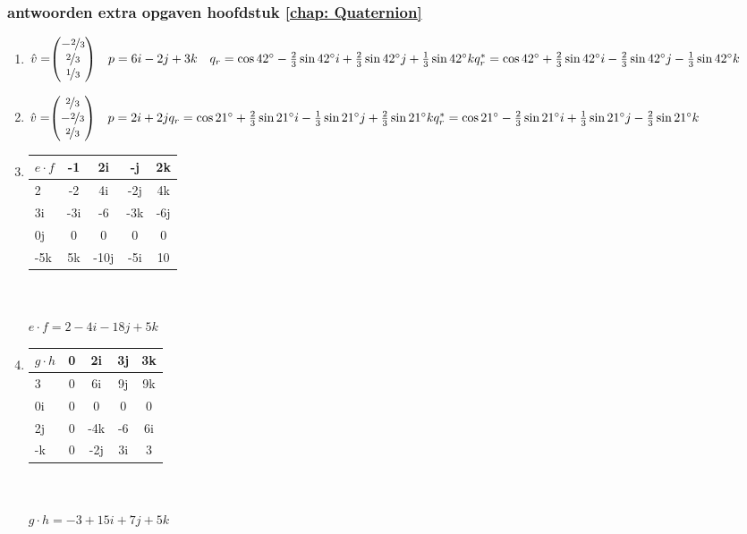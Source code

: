 \subsubsection{antwoorden extra opgaven hoofdstuk \ref{chap: Quaternion}}
\begin{enumerate}
	\item 
	$\hat{v} = \vecdrie{-\nicefrac{2}{3}}{\nicefrac{2}{3}}{\nicefrac{1}{3}}
	\quad p  = 6i - 2j + 3k  \\
	\quad q_r  =  \cos 42 \degree  - \frac{2 }{3}\sin 42 \degree i 
	+ \frac{2 }{3}\sin 42 \degree j + \frac{1 }{3}\sin 42 \degree k \\
	q^*_r  =  \cos 42 \degree  + \frac{2 }{3}\sin 42 \degree i 
	- \frac{2 }{3}\sin 42 \degree j - \frac{1 }{3}\sin 42 \degree k $
	
	\item 
	$\hat{v} = \vecdrie{\nicefrac{2}{3}}{- \nicefrac{2}{3}}{\nicefrac{2}{3}}
	\quad p  = 2i + 2j   \\
	q_r  =  \cos 21 \degree  + \frac{2 }{3}\sin 21 \degree i 
	- \frac{1}{3}\sin 21 \degree j
	+ \frac{2 }{3 } \sin 21 \degree k   \\
	q^*_r  =  \cos 21 \degree  - \frac{2 }{3}\sin 21 \degree i 
	+ \frac{1}{3}\sin 21 \degree j
	- \frac{2 }{3 } \sin 21 \degree k $
	
	\item
	\begin{tabular}{ | l || c | c |c |c |}
		\hline
		$ e\cdot f $ &-1 & 2i   & -j & 2k \\ \hline \hline
		2    & -2 & 4i     &  -2j   & 4k  \\ \hline
		3i    & -3i & -6  &  -3k   & -6j  \\ \hline
		0j   & 0 &  0 &   0     & 0\\ \hline
		-5k    & 5k  & -10j   & -5i   & 10\\ 
		\hline 
	\end{tabular} \\ \\
	$ e\cdot f = 2  - 4i -18j + 5k $
	
	\item
	\begin{tabular}{ | l || c | c |c |c |}
		\hline
		$ g\cdot h $ & 0 & 2i  & 3j       & 3k \\ \hline \hline
		3          & 0 & 6i   &   9j    & 9k  \\ \hline
		0i         & 0 & 0   &   0    & 0 \\ \hline
		2j         & 0 &  -4k  &   -6     & 6i\\ \hline
		-k         & 0  & -2j  & 3i      & 3\\ 
		\hline 
	\end{tabular} \\ \\
	$ g\cdot h = -3 +15i + 7j + 5k $
	

\end{enumerate}
